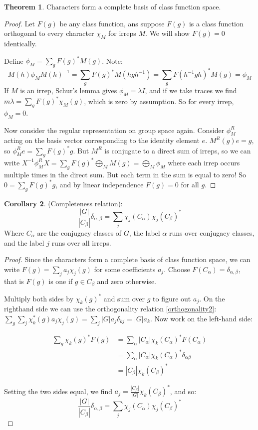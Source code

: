 \documentclass[12pt, letterpaper]{article}
\theoremstyle{definition} %
\newtheorem{thm}{Theorem}[section] %
\newtheorem{cor}[thm]{Corollary}
\begin{document}
\begin{thm}
  Characters form a complete basis of class function space.
\end{thm}
\begin{proof}
  Let $F(g)$ be any class function, ans suppose $F(g)$ is a class function orthogonal to every
  character $\chi_M$ for irreps $M$. We will show $F(g)=0$ identically. 

  Define $\phi_M=\sum_g F(g)^* M(g)$. Note:
  $$M(h)\phi_M M(h)^{-1}=\sum_g F(g)^* M(hgh^{-1})=\sum_g F(h^{-1}gh)^* M(g)=\phi_M$$
  If $M$ is an irrep, Schur's lemma gives $\phi_M=\lambda I$, and if we take traces we find $m\lambda=\sum_g F(g)^* \chi_M(g)$,
  which is zero by assumption. So for every irrep, $\phi_M=0$.
  
  Now consider the regular representation on group space again. Consider $\phi_M^R$ acting on the basis vector corresponding to the identity element $e$.
  $M^R(g) e=g$, so $\phi_M^R e=\sum_g F(g)^* g$. But $M^R$ is conjugate to a direct sum of irreps, so we can write 
  $X^{-1}\phi_M^R X=\sum_g F(g)^* \bigoplus_M M(g)=\bigoplus_M \phi_M$ where each irrep occurs multiple times in the direct sum. But each term in the sum is equal to zero!
  So $0=\sum_g F(g)^* g$, and by linear independence $F(g)=0$ for all $g$.
\end{proof}

\begin{cor} (Completeness relation):
  $$\frac{|G|}{|C_\beta|}\delta_{\alpha,\beta}=\sum_j  \chi_j(C_\alpha) \chi_j(C_\beta)^*$$
  Where $C_\alpha$ are the conjugacy classes of $G$, the label $\alpha$ runs over conjugacy classes, and the label $j$ runs over all irreps.
  \label{completeness}
\end{cor}
\begin{proof}
  Since the characters form a complete basis of class function space, we can write $F(g)=\sum_j a_j \chi_j(g)$ for some coefficients $a_j$. 
  Choose $F(C_\alpha)=\delta_{\alpha,\beta}$, that is $F(g)$ is one if $g\in C_\beta$ and zero otherwise. 

  Multiply both sides by $\chi_k(g)^*$ and sum over $g$ to figure out $a_j$. 
  On the righthand side we can use the orthogonality relation \ref{orthogonality2}:
  $\sum_g \sum_j \chi_k^*(g) a_j \chi_j(g)=\sum_j |G| a_j \delta_{kj}=|G|a_k$. Now work on the left-hand side:

  \begin{align*}
    \sum_g \chi_k(g)^* F(g) &=\sum_\alpha |C_\alpha| \chi_k(C_\alpha)^* F(C_\alpha)\\
    &=\sum_\alpha |C_\alpha| \chi_k(C_\alpha)^* \delta_{\alpha \beta}\\
    &=|C_\beta| \chi_k(C_\beta)^*
  \end{align*}

  Setting the two sides equal, we find $a_j=\frac{|C_\beta|}{|G|} \chi_k(C_\beta)^*$, and so:
  $$\frac{|G|}{|C_\beta|}\delta_{\alpha,\beta}=\sum_j  \chi_j(C_\alpha) \chi_j(C_\beta)^*$$
\end{proof}
\end{document}
